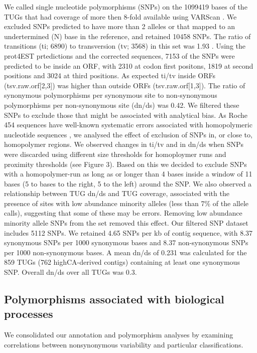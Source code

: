 \documentclass[10pt]{bmc_article}
\newenvironment{bmcformat}{\begin{raggedright}\baselineskip20pt\sloppy\setboolean{publ}{false}}{\end{raggedright}\baselineskip20pt\sloppy}
\begin{document}
\begin{bmcformat}
We called single nucleotide polymorphisms (SNPs) on the
1099419 bases of the TUGs that had coverage of more then
8-fold available using VARScan \cite{pmid19542151}. We excluded SNPs
predicted to have more than 2 alleles or that mapped to an
undertermined (N) base in the reference, and retained
10458 SNPs. The ratio of transitions (ti;
6890) to transversion (tv;
3568) in this set was
1.93 . Using the prot4EST
prtedictions and the corrected sequences, 7153 of
the SNPs were predicted to be inside an ORF, with
2310 at codon first positons, 1819
at second positions and 3024 at third positions. As
expected ti/tv inside ORFs (tsv.raw.orf[2,3]) was higher than outside
ORFs (tsv.raw.orf[1,3]). The ratio of synonymous polymorphisms per
synonymous site to non-synonymous polymorphisms per non-synonymous
site (dn/ds) was 0.42. We filtered these SNPs to exclude
those that might be associated with analytical bias. As Roche 454
sequences have well-known systematic errors associated with
homopolymeric nucleotide sequences \cite{pmid21685085}, we analysed
the effect of exclusion of SNPs in, or close to, homopolymer
regions. We observed changes in ti/tv and in dn/ds when SNPs were
discarded using different size thresholds for homoploymer runs and
proximity thresholds (see Figure 3). Based on this we decided to
exclude SNPs with a homopolymer-run as long as or longer than 4 bases
inside a window of 11 bases (5 to bases to the right, 5 to the left)
around the SNP. We also observed a relationship between TUG dn/ds and
TUG coverage, associated with the presence of sites with low abundance
minority alleles (less than 7\% of the allele calls), suggesting that
some of these may be errors.  Removing low abundance minority allele
SNPs from the set removed this effect.  Our filtered SNP dataset
includes 5112 SNPs. We retained 4.65 SNPs
per kb of contig sequence, with 8.37 synonymous SNPs
per 1000 synonymous bases and 8.37 non-synonymous SNPs
per 1000 non-synonymous bases. A mean dn/ds of
0.231 was calculated for the
859 TUGs (762
highCA-derived contigs) containing at least one synonymous SNP.
Overall dn/ds over all TUGs was 0.3.

\subsection*{Polymorphisms associated with biological processes}

We consolidated our annotation and polymorphism analyses by examining
correlations between nonsynonymous variability and particular
classifications. 


\end{bmcformat}
\end{document}
